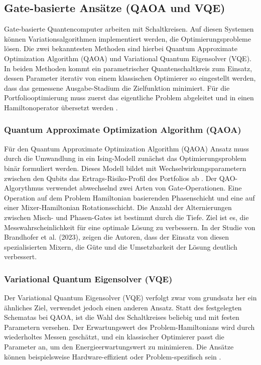 \subsection{Gate-basierte Ansätze (QAOA und VQE)}

Gate-basierte Quantencomputer arbeiten mit Schaltkreisen. Auf diesen Systemen können Variationsalgorithmen implementiert werden, die Optimierungsprobleme lösen. Die zwei bekanntesten Methoden sind hierbei Quantum Approximate Optimization Algorithm (QAOA) und Variational Quantum Eigensolver (VQE). In beiden Methoden kommt ein parametrischer Quantenschaltkreis zum Einsatz, dessen Parameter iterativ von einem klassischen
Optimierer so eingestellt werden, dass das gemessene Ausgabe-Stadium die Zielfunktion minimiert. Für die Portfoliooptimierung muss zuerst das eigentliche Problem abgeleitet und in einen Hamiltonoperator übersetzt werden \cite{buonaiuto_best_2023, brandhofer_benchmarking_2022}.
 
\subsubsection*{Quantum Approximate Optimization Algorithm (QAOA)}
Für den Quantum Approximate Optimization Algorithm (QAOA) Ansatz muss durch die Umwandlung in ein Ising-Modell zunächst das Optimierungsproblem binär formuliert werden. Dieses Modell bildet mit Wechselwirkungsparametern zwischen den Qubits das Ertrags-Risiko-Profil des Portfolios ab \cite{brandhofer_benchmarking_2022}.
Der QAO-Algorythmus verwendet abwechselnd zwei Arten von Gate-Operationen. Eine Operation auf dem Problem Hamiltonian basierenden Phasenschicht und eine auf einer Mixer-Hamiltonian Rotationsschicht. ­Die Anzahl der Alternierungen zwischen Misch- und Phasen-Gates ist bestimmt durch die Tiefe. Ziel ist es, die Messwahrscheinlichkeit für eine optimale Lösung zu verbessern. In der Studie von Brandhofer et al. (2023), zeigen die Autoren, dass der Einsatz von diesen spezialisierten Mixern, die Güte und die Umsetzbarkeit der Lösung deutlich verbessert.

\subsubsection*{Variational Quantum Eigensolver (VQE)}
Der Variational Quantum Eigensolver (VQE) verfolgt zwar vom grundsatz her ein ähnliches Ziel, verwendet jedoch einen anderen Ansatz. Statt des festgelegten Schematas bei QAOA, ist die Wahl des Schaltkreises beliebig und mit festen Parametern versehen. Der Erwartungswert des Problem-Hamiltonians wird durch wiederholtes Messen geschätzt, und ein klassischer Optimierer passt die Parameter an, um den Energieerwartungswert zu minimieren. Die Ansätze können beispielsweise Hardware-effizient oder Problem-spezifisch sein \cite{brandhofer_benchmarking_2022}.

